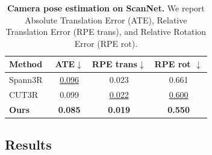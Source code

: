 \begin{table}[t]
	\centering
	\small
	\caption{\textbf{Camera pose estimation on ScanNet.} We report Absolute Translation Error (ATE), Relative Translation Error (RPE trans), and Relative Rotation Error (RPE rot).}
	\label{tab:pose_scannet}
	\begin{tabular}{l ccc}
		\toprule
		Method & ATE$\downarrow$ & RPE trans$\downarrow$ & RPE rot $\downarrow$ \\
		\midrule
		Spann3R~\cite{wang20243d} & \underline{0.096} & 0.023 & 0.661 \\
		CUT3R~\cite{wang2025continuous} & 0.099 & \underline{0.022} & \underline{0.600} \\
		\textbf{Ours} & \textbf{0.085} & \textbf{0.019} & \textbf{0.550} \\
		\bottomrule
	\end{tabular}
\end{table}
\begin{table}[t]
	\centering
	\setlength{\abovedisplayskip}{0pt}
	\setlength{\belowdisplayskip}{0pt}
    \small
	\caption{\textbf{Quantitative comparison of semantic segmentation on ScanNet~\cite{dai2017scannet}.} We report the average IoU scores ($\%$) and average accuracy ($\%$). We denote Gaussian-Grouping~\cite{ye2024gaussian} as GS-Group.}
    \vspace{2pt}
    \label{tab:scannet_lang}
    \vspace{-2pt}
\end{table}


\subsection{Results}
